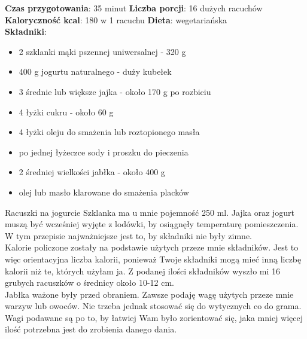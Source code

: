 \documentclass[a4paper]{article}
\begin{document}
\noindent\textbf{Czas przygotowania}: 35 minut \newline
\textbf{Liczba porcji}: 16 dużych racuchów \newline \\
\textbf{Kaloryczność kcal}: 180 w 1 racuchu \newline
\textbf{Dieta}: wegetariańska \newline \\
\textbf{Składniki}: 
\begin{itemize}
\item 2 szklanki mąki pszennej uniwersalnej - 320 g
\item 400 g jogurtu naturalnego - duży kubełek
\item 3 średnie lub większe jajka - około 170 g po rozbiciu
\item 4 łyżki cukru - około 60 g
\item 4 łyżki oleju do smażenia lub roztopionego masła
\item po jednej łyżeczce sody i proszku do pieczenia
\item 2 średniej wielkości jabłka - około 400 g
\item olej lub masło klarowane do smażenia placków
\end{itemize}
\large{Racuszki na jogurcie} \newline
Szklanka ma u mnie pojemność 250 ml. \newline
Jajka oraz jogurt muszą być wcześniej wyjęte z lodówki, by osiągnęły temperaturę pomieszczenia. W tym przepisie najważniejsze jest to, by składniki nie były zimne. \newline \\
Kalorie policzone zostały na podstawie użytych przeze mnie składników. Jest to więc orientacyjna liczba kalorii, ponieważ Twoje składniki mogą mieć inną liczbę kalorii niż te, których użyłam ja. Z podanej ilości składników wyszło mi 16 grubych racuszków o średnicy około 10-12 cm. \newline \\
Jabłka ważone były przed obraniem. Zawsze podaję wagę użytych przeze mnie warzyw lub owoców. Nie trzeba jednak stosować się do wytycznych co do grama. Wagi podawane są po to, by łatwiej Wam było zorientować się, jaka mniej więcej ilość potrzebna jest do zrobienia danego dania. 
\end{document}
